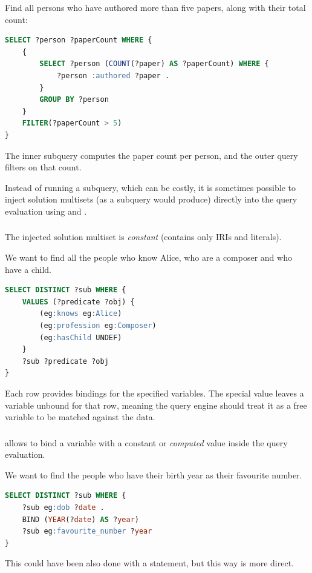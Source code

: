 \begin{example}{}
    Find all persons who have authored more than five papers, along with their total count:
    \begin{lstlisting}[language=SQL, caption={Subquery for pre-aggregation}]
SELECT ?person ?paperCount WHERE {
    {
        SELECT ?person (COUNT(?paper) AS ?paperCount) WHERE {
            ?person :authored ?paper .
        }
        GROUP BY ?person
    }
    FILTER(?paperCount > 5)
}
    \end{lstlisting}
    The inner subquery computes the paper count per person, and the outer query filters on that count.
\end{example}

Instead of running a subquery, which can be costly, it is sometimes possible to inject solution multisets (as a subquery would produce) directly into the query evaluation using  and .

\subsubsection{}
The injected solution multiset is \emph{constant} (contains only IRIs and literals). 

\begin{example}{}
    We want to find all the people who know Alice, who are a composer and who have a child.
    \begin{lstlisting}[language=SQL]
SELECT DISTINCT ?sub WHERE {
    VALUES (?predicate ?obj) {
        (eg:knows eg:Alice)
        (eg:profession eg:Composer)
        (eg:hasChild UNDEF)
    }
    ?sub ?predicate ?obj
}
    \end{lstlisting}
    Each row provides bindings for the specified variables. The special value  leaves a variable unbound for that row, meaning the query engine should treat it as a free variable to be matched against the data.
\end{example}

\subsubsection{}

 allows to bind a variable with a constant or \emph{computed} value inside the query evaluation.

\begin{example}{}
    We want to find the people who have their birth year as their favourite number. 
    \begin{lstlisting}[language=SQL]
SELECT DISTINCT ?sub WHERE {
    ?sub eg:dob ?date .
    BIND (YEAR(?date) AS ?year)
    ?sub eg:favourite_number ?year
}
    \end{lstlisting}
    This could have been also done with a  statement, but this way is more direct.
\end{example}

